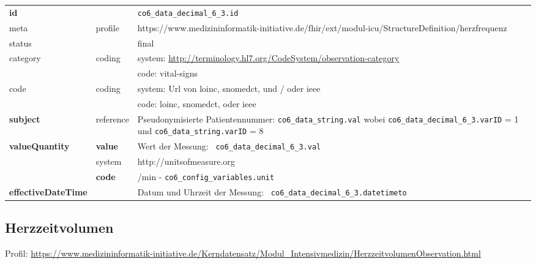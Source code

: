 \begin{longtable}{|l|l|p{7.5cm}|}
        \hline
        \rowcolor{lightgray} \multicolumn{3}{|l|}{Data Mapping (inhaltlich)} \\ \hline
        \textbf{id} &  & \texttt{co6\_data\_decimal\_6\_3.id} \\ \hline
	meta & profile & https://www.medizininformatik-initiative.de/fhir/ext/modul-icu/StructureDefinition/herzfrequenz \\ \hline 
	status &  & final   \\ \hline 
	category & coding & system: \url{http://terminology.hl7.org/CodeSystem/observation-category} \\
\cline{3-3}
	& & code: vital-signs\\ \hline
	code & coding & system: Url von \ac{loinc}, \ac{snomedct}, und / oder \ac{ieee} \\ 
	\cline{3-3} 
	 &  & code: \ac{loinc}, \ac{snomedct}, oder \ac{ieee} \\ \hline
	 \textbf{subject} & reference & Pseudonymisierte Patientennummer: \texttt{co6\_data\_string.val} wobei \texttt{co6\_data\_decimal\_6\_3.varID} = 1 und \texttt{co6\_data\_string.varID} = 8 \\ \hline
	 \textbf{valueQuantity}  & \textbf{value} & Wert der Messung: \texttt{
co6\_data\_decimal\_6\_3.val} \\
        \cline{2-3}
         & system & http://unitsofmeasure.org \\
         \cline{2-3}
         & \textbf{code} & /min - \texttt{co6\_config\_variables.unit} \\ \hline
     \textbf{effectiveDateTime}  & & Datum und Uhrzeit der Messung: \texttt{
co6\_data\_decimal\_6\_3.datetimeto} \\ \hline
\end{longtable}

\subsection{Herzzeitvolumen} 

Profil: \url{https://www.medizininformatik-initiative.de/Kerndatensatz/Modul_Intensivmedizin/HerzzeitvolumenObservation.html}

